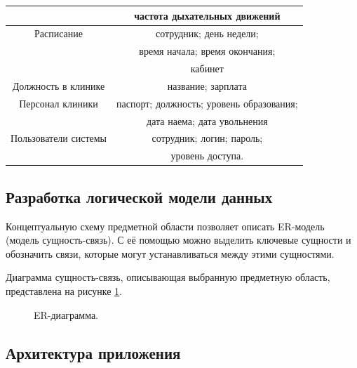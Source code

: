 \documentclass[a4paper,14pt]{article}
\begin{document}
\begin{table}[!h]
\begin{center}
\begin{tabular}{| c | c |}
		& частота дыхательных движений \\ \hline
	Расписание & сотрудник; день недели; \\
		& время начала; время окончания; \\
		& кабинет \\ \hline
    Должность в клинике & название; зарплата \\ \hline
	Персонал клиники & паспорт; должность; уровень образования; \\
		& дата наема; дата увольнения \\ \hline
	Пользователи системы & сотрудник; логин; пароль; \\
		& уровень доступа. \\ \hline
	\end{tabular}
	\end{center}
\end{table}

\newpage
\subsection{Разработка логической модели данных}

Концептуальную схему предметной области позволяет описать ER-модель (модель сущность-связь). С её помощью можно выделить ключевые сущности и обозначить связи, которые могут устанавливаться между этими сущностями.

Диаграмма сущность-связь, описывающая выбранную предметную область, представлена на рисунке \ref{fig:er}.

\begin{figure}[!h]
	\caption{ER-диаграмма.}
	\label{fig:er}
\end{figure}

\newpage

\subsection{Архитектура приложения}
\end{document}
